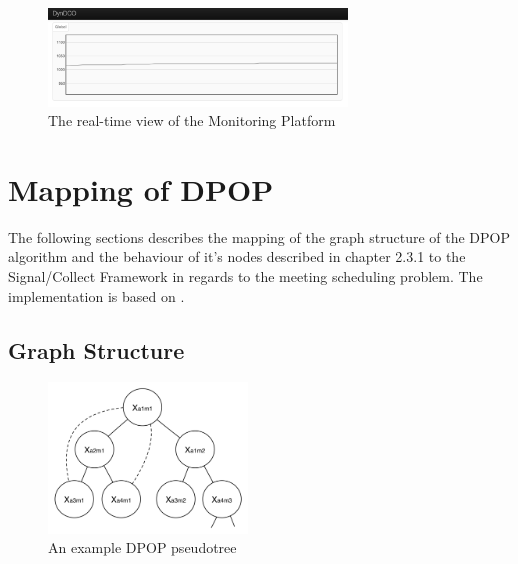 \begin{figure}[H]
\includegraphics[width=300px]{graphics/monitoring}
\centering
\caption{The real-time view of the Monitoring Platform}
\label{fig:monitoring}
\end{figure}

\section{Mapping of DPOP}

The following sections describes the mapping of the graph structure of the DPOP algorithm and the behaviour of it's nodes described in chapter 2.3.1 to the Signal/Collect Framework  in regards to the meeting scheduling problem. The implementation is based on \cite{Petcu2003}.

\subsection{Graph Structure}
\begin{figure}[h]
\includegraphics[width=200px]{graphics/dpop_graph}
\centering
\caption{An example DPOP pseudotree}
\label{fig:dpop_graph}
\end{figure}

